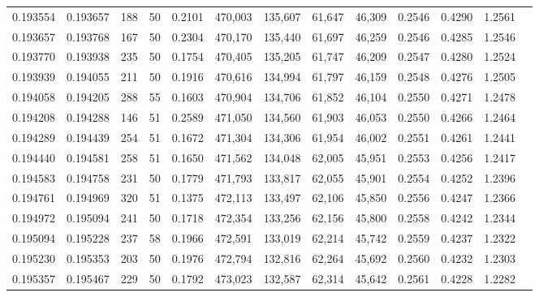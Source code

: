\begin{tabular}{rrrrrrrrrrrrr}
0.193554 & 0.193657 &   188 &  50 &                                     0.2101 & 470,003 & 135,607 &  61,647 &  46,309 & 0.2546 & 0.4290 & 1.2561 \\
0.193657 & 0.193768 &   167 &  50 &                                     0.2304 & 470,170 & 135,440 &  61,697 &  46,259 & 0.2546 & 0.4285 & 1.2546 \\
0.193770 & 0.193938 &   235 &  50 &                                     0.1754 & 470,405 & 135,205 &  61,747 &  46,209 & 0.2547 & 0.4280 & 1.2524 \\
0.193939 & 0.194055 &   211 &  50 &                                     0.1916 & 470,616 & 134,994 &  61,797 &  46,159 & 0.2548 & 0.4276 & 1.2505 \\
0.194058 & 0.194205 &   288 &  55 &                                     0.1603 & 470,904 & 134,706 &  61,852 &  46,104 & 0.2550 & 0.4271 & 1.2478 \\
0.194208 & 0.194288 &   146 &  51 &                                     0.2589 & 471,050 & 134,560 &  61,903 &  46,053 & 0.2550 & 0.4266 & 1.2464 \\
0.194289 & 0.194439 &   254 &  51 &                                     0.1672 & 471,304 & 134,306 &  61,954 &  46,002 & 0.2551 & 0.4261 & 1.2441 \\
0.194440 & 0.194581 &   258 &  51 &                                     0.1650 & 471,562 & 134,048 &  62,005 &  45,951 & 0.2553 & 0.4256 & 1.2417 \\
0.194583 & 0.194758 &   231 &  50 &                                     0.1779 & 471,793 & 133,817 &  62,055 &  45,901 & 0.2554 & 0.4252 & 1.2396 \\
0.194761 & 0.194969 &   320 &  51 &                                     0.1375 & 472,113 & 133,497 &  62,106 &  45,850 & 0.2556 & 0.4247 & 1.2366 \\
0.194972 & 0.195094 &   241 &  50 &                                     0.1718 & 472,354 & 133,256 &  62,156 &  45,800 & 0.2558 & 0.4242 & 1.2344 \\
0.195094 & 0.195228 &   237 &  58 &                                     0.1966 & 472,591 & 133,019 &  62,214 &  45,742 & 0.2559 & 0.4237 & 1.2322 \\
0.195230 & 0.195353 &   203 &  50 &                                     0.1976 & 472,794 & 132,816 &  62,264 &  45,692 & 0.2560 & 0.4232 & 1.2303 \\
0.195357 & 0.195467 &   229 &  50 &                                     0.1792 & 473,023 & 132,587 &  62,314 &  45,642 & 0.2561 & 0.4228 & 1.2282 \\

\end{tabular}
